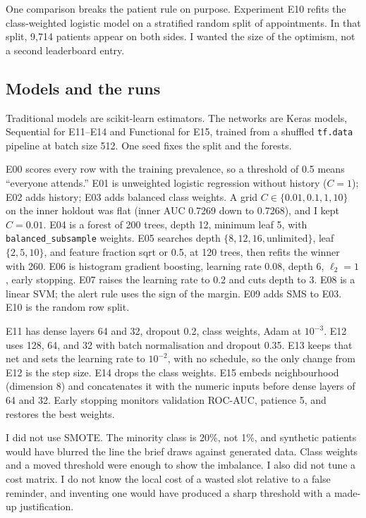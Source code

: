 \documentclass[conference]{IEEEtran}
\begin{document}
One comparison breaks the patient rule on purpose. Experiment E10 refits the class-weighted logistic model on a stratified random split of appointments. In that split, 9,714 patients appear on both sides. I wanted the size of the optimism, not a second leaderboard entry.

\subsection{Models and the runs}
Traditional models are scikit-learn estimators. The networks are Keras models, Sequential for E11--E14 and Functional for E15, trained from a shuffled \texttt{tf.data} pipeline at batch size 512. One seed fixes the split and the forests.

E00 scores every row with the training prevalence, so a threshold of 0.5 means ``everyone attends.'' E01 is unweighted logistic regression without history ($C=1$); E02 adds history; E03 adds balanced class weights. A grid $C \in \{0.01, 0.1, 1, 10\}$ on the inner holdout was flat (inner AUC 0.7269 down to 0.7268), and I kept $C=0.01$. E04 is a forest of 200 trees, depth 12, minimum leaf 5, with \texttt{balanced\_subsample} weights. E05 searches depth $\{8, 12, 16, \text{unlimited}\}$, leaf $\{2, 5, 10\}$, and feature fraction sqrt or 0.5, at 120 trees, then refits the winner with 260. E06 is histogram gradient boosting, learning rate 0.08, depth 6, $\ell_2=1$, early stopping. E07 raises the learning rate to 0.2 and cuts depth to 3. E08 is a linear SVM; the alert rule uses the sign of the margin. E09 adds SMS to E03. E10 is the random row split.

E11 has dense layers 64 and 32, dropout 0.2, class weights, Adam at $10^{-3}$. E12 uses 128, 64, and 32 with batch normalisation and dropout 0.35. E13 keeps that net and sets the learning rate to $10^{-2}$, with no schedule, so the only change from E12 is the step size. E14 drops the class weights. E15 embeds neighbourhood (dimension 8) and concatenates it with the numeric inputs before dense layers of 64 and 32. Early stopping monitors validation ROC-AUC, patience 5, and restores the best weights.

I did not use SMOTE. The minority class is 20\%, not 1\%, and synthetic patients would have blurred the line the brief draws against generated data. Class weights and a moved threshold were enough to show the imbalance. I also did not tune a cost matrix. I do not know the local cost of a wasted slot relative to a false reminder, and inventing one would have produced a sharp threshold with a made-up justification.
\end{document}
